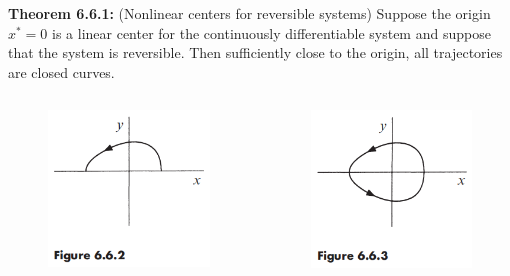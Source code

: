 \documentclass[9pt,aspectratio=43,mathserif,table]{beamer}
\begin{document}
\begin{frame}
	\textbf{Theorem 6.6.1:} (Nonlinear centers for reversible systems) Suppose the origin $x^* =0$ is a linear center for the continuously differentiable system and suppose that the system is reversible. Then sufficiently close to the origin, all trajectories are closed curves.
	$$\ $$

	\begin{columns}
		\begin{column}{0.5\textwidth}
			\begin{figure}
				\centering
				\includegraphics[width=0.6\linewidth]{fig662.jpg}
			\end{figure}
		\end{column}
		\begin{column}{0.5\textwidth}  %
			\begin{figure}
				\centering
				\includegraphics[width=0.6\linewidth]{fig663.jpg}
			\end{figure}
		\end{column}
	\end{columns}	
\end{frame}
\end{document}
